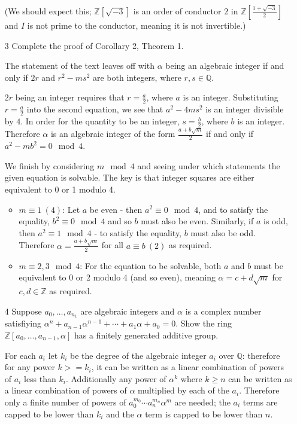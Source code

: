 \documentclass{article}
\newcommand{\modequiv}[3]{#1 \equiv #2\ (#3)}
\begin{document}
\begin{enumerate}
    (We should expect this; $\mathbb{Z}[\sqrt{-3}]$ is an order of conductor $2$ in $\mathbb{Z}[\frac{1 + \sqrt{-3}}{2}]$ and $I$ is not prime to the conductor, meaning it is not invertible.)

\item[3]
    Complete the proof of Corollary 2, Theorem 1.

    The statement of the text leaves off with $\alpha$ being an algebraic integer if and only if $2r$ and $r^2 - ms^2$ are both integers, where $r, s \in \mathbb{Q}$.

    $2r$ being an integer requires that $r = \frac{a}{2}$, where $a$ is an integer.  Substituting $r = \frac{a}{2}$ into the second equation, we see that $a^2 - 4ms^2$ is an integer divisible by $4$.  In order for the quantity to be an integer, $s = \frac{b}{2}$, where $b$ is an integer.  Therefore $\alpha$ is an algebraic integer of the form $\frac{a + b\sqrt{m}}{2}$ if and only if $a^2 - mb^2 = 0 \mod 4$.

    We finish by considering $m \mod 4$ and seeing under which statements the given equation is solvable.  The key is that integer squares are either equivalent to 0 or 1 modulo 4.
    \begin{itemize}
        \item {\bf $\modequiv{m}{1}{4}$}:  Let $a$ be even - then $a^2 \equiv 0 \mod 4$, and to satisfy the equality, $b^2 \equiv 0 \mod 4$ and so $b$ must also be even.  Similarly, if $a$ is odd, then $a^2 \equiv 1 \mod 4$ - to satisfy the equality, $b$ must also be odd.  Therefore $\alpha = \frac{a + b\sqrt{m}}{2}$ for all $a \equiv b\ (2)$ as required.
        \item {\bf $m \equiv 2, 3 \mod 4$}: For the equation to be solvable, both $a$ and $b$ must be equivalent to 0 or 2 modulo 4 (and so even), meaning $\alpha = c + d\sqrt{m}$ for $c, d \in \mathbb{Z}$ as required.
    \end{itemize}

\item[4]
    Suppose $a_0, \ldots, a_{n_1}$ are algebraic integers and $\alpha$ is a complex number satisfiying $\alpha^n + a_{n-1}\alpha^{n-1} + \cdots + a_1\alpha + a_0 = 0$.  Show the ring $\mathbb{Z}{[a_0, \ldots, a_{n-1}, \alpha]}$ has a finitely generated additive group.

    For each $a_i$ let $k_i$ be the degree of the algebraic integer $a_i$ over $\mathbb{Q}$: therefore for any power $k >= k_i$, it can be written as a linear combination of powers of $a_i$ less than $k_i$.  Additionally any power of $\alpha^k$ where $k \ge n$ can be written as a linear combination of powers of $\alpha$ multiplied by each of the $a_i$.  Therefore only a finite number of powers of $a_0^{m_0} \cdots a_n^{m_n} \alpha^{m}$ are needed; the $a_i$ terms are capped to be lower than $k_i$ and the $\alpha$ term is capped to be lower than $n$.


\end{enumerate}
\end{document}
